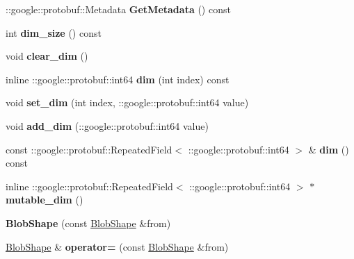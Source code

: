 \begin{DoxyCompactItemize}
\+::google\+::protobuf\+::\+Metadata {\bfseries Get\+Metadata} () const
\item 
\mbox{\label{classcaffe_1_1_blob_shape_a9268d68cbd5fe7224e1f88d110254097}} 
int {\bfseries dim\+\_\+size} () const
\item 
\mbox{\label{classcaffe_1_1_blob_shape_a2e42c7e89e6757a77fc2fb7c640ba3db}} 
void {\bfseries clear\+\_\+dim} ()
\item 
\mbox{\label{classcaffe_1_1_blob_shape_a22dbf8e87b4a8fb5e97921bb5b79b515}} 
inline \+::google\+::protobuf\+::int64 {\bfseries dim} (int index) const
\item 
\mbox{\label{classcaffe_1_1_blob_shape_ac2607945d73b985c1d1d667d75e3f220}} 
void {\bfseries set\+\_\+dim} (int index, \+::google\+::protobuf\+::int64 value)
\item 
\mbox{\label{classcaffe_1_1_blob_shape_ae204db4e08616793e3de02e93e335705}} 
void {\bfseries add\+\_\+dim} (\+::google\+::protobuf\+::int64 value)
\item 
\mbox{\label{classcaffe_1_1_blob_shape_a3aa876169882cd62df7836659e045e5a}} 
const \+::google\+::protobuf\+::\+Repeated\+Field$<$ \+::google\+::protobuf\+::int64 $>$ \& {\bfseries dim} () const
\item 
\mbox{\label{classcaffe_1_1_blob_shape_a049f413f10afdef7bd234d4c47112833}} 
inline \+::google\+::protobuf\+::\+Repeated\+Field$<$ \+::google\+::protobuf\+::int64 $>$ $\ast$ {\bfseries mutable\+\_\+dim} ()
\item 
\mbox{\label{classcaffe_1_1_blob_shape_a6c2a73c9e6da5792eb882c383ecdda94}} 
{\bfseries Blob\+Shape} (const \mbox{\hyperlink{classcaffe_1_1_blob_shape}{Blob\+Shape}} \&from)
\item 
\mbox{\label{classcaffe_1_1_blob_shape_addf6ed92af916390daa964689027944c}} 
\mbox{\hyperlink{classcaffe_1_1_blob_shape}{Blob\+Shape}} \& {\bfseries operator=} (const \mbox{\hyperlink{classcaffe_1_1_blob_shape}{Blob\+Shape}} \&from)

\end{DoxyCompactItemize}
